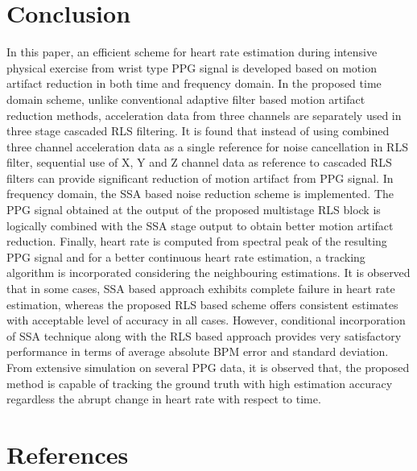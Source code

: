 \documentclass[final,3p,times,authoryear]{elsarticle}
\begin{document}



\section{Conclusion}
In this paper, an efficient scheme for heart rate estimation during intensive physical exercise from wrist type PPG signal is developed based on motion artifact reduction in both time and frequency domain. In the proposed time domain scheme, unlike conventional adaptive filter based motion artifact reduction methods, acceleration data from three channels are separately used in three stage cascaded RLS filtering. It is found that instead of using combined three channel acceleration data as a single reference for noise cancellation in RLS filter, sequential use of X, Y and Z channel data as reference to cascaded RLS filters  can provide significant reduction of motion artifact from PPG signal. In frequency domain, the SSA based noise reduction scheme is implemented. The PPG signal obtained at the output of the proposed multistage RLS block is logically combined with the SSA stage output to obtain better motion artifact reduction. Finally, heart rate is computed from spectral peak  of the resulting PPG signal and for a better continuous heart rate estimation, a tracking algorithm is incorporated considering the neighbouring estimations. It is observed that in some cases, SSA based approach exhibits complete failure in heart rate estimation, whereas the proposed RLS based scheme offers consistent estimates with acceptable level of accuracy in all cases. However, conditional incorporation of SSA technique along with the RLS based approach provides very satisfactory performance in terms of  average absolute BPM error and standard deviation. From extensive simulation on several PPG data, it is observed that, the proposed method is capable of tracking the ground truth with high estimation accuracy regardless the abrupt change in heart rate with respect to time. 




\renewcommand{\baselinestretch}{1.5}


\section*{References}



\renewcommand{\baselinestretch}{1.5}

\clearpage\newpage

\renewcommand{\footnotesize}{\fontsize{10}{9}\selectfont}
\end{document}

